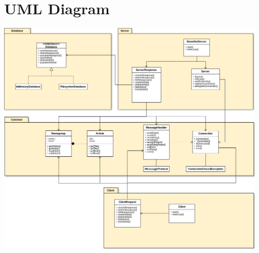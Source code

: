 \documentclass[a4paper, titlepage]{article}
\begin{document}
\section{UML Diagram}\label{App:AppendixA}
\includegraphics[width=130mm]{NewsNet_UML.png}
\end{document}
